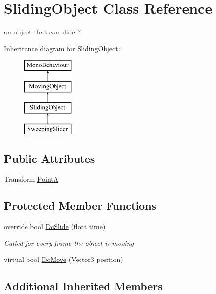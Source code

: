 \hypertarget{class_sliding_object}{}\section{Sliding\+Object Class Reference}
\label{class_sliding_object}


an object that can slide ?  


Inheritance diagram for Sliding\+Object\+:\begin{figure}[H]
\begin{center}
\leavevmode
\includegraphics[height=4.000000cm]{class_sliding_object}
\end{center}
\end{figure}
\subsection*{Public Attributes}
\begin{DoxyCompactItemize}
\item 
Transform \mbox{\hyperlink{class_sliding_object_a729c34668d902ec1a2d1bd3b3612ca97}{PointA}}
\end{DoxyCompactItemize}
\subsection*{Protected Member Functions}
\begin{DoxyCompactItemize}
\item 
override bool \mbox{\hyperlink{class_sliding_object_a5da98cd763d752b6a7378d181b35f3d0}{Do\+Slide}} (float time)
\begin{DoxyCompactList}\small\item\em Called for every frame the object is moving \end{DoxyCompactList}\item 
virtual bool \mbox{\hyperlink{class_sliding_object_ab5a9f4c9a30b3fd106f9c4ea9218d679}{Do\+Move}} (Vector3 position)
\end{DoxyCompactItemize}
\subsection*{Additional Inherited Members}


